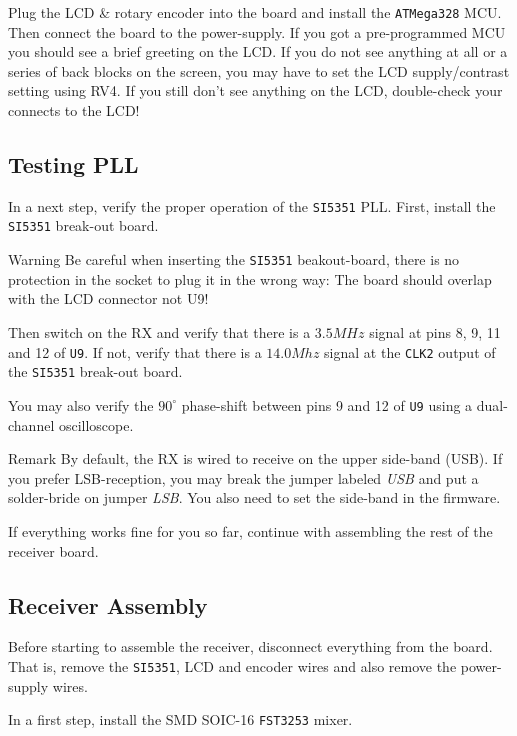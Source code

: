 \documentclass[10pt, a4paper,twoside]{scrartcl}
\newenvironment{remark}{\begin{bclogo}[couleur=blue!30,arrondi=.1,logo=\bcinfo,ombre=true]{Remark}}{\end{bclogo}}
\newenvironment{warning}{\begin{bclogo}[couleur=red!30,arrondi=.1,logo=\bcattention,ombre=true]{Warning}}{\end{bclogo}}
\begin{document}
 Plug the LCD \& rotary encoder into the board and install the \texttt{ATMega328} MCU. Then connect the board to the power-supply. If you got a pre-programmed MCU you should see a brief greeting on the LCD. If you do not see anything at all or a series of back blocks on the screen, you may have to set the LCD supply/contrast setting using RV4. If you still don't see anything on the LCD, double-check your connects to the LCD! 

\subsection{Testing PLL}
In a next step, verify the proper operation of the \texttt{SI5351} PLL. First, install the \texttt{SI5351} break-out board. 

\begin{warning}
 Be careful when inserting the \texttt{SI5351} beakout-board, there is no protection in the socket to plug it in the wrong way: The board should overlap with the LCD connector not U9!
\end{warning}
 
Then switch on the RX and verify that there is a $3.5MHz$ signal at pins 8, 9, 11 and 12 of \texttt{U9}. If not, verify that there is a $14.0Mhz$ signal at the \texttt{CLK2} output of the \texttt{SI5351} break-out board. 

You may also verify the $90^\circ$ phase-shift between pins 9 and 12 of \texttt{U9} using a dual-channel oscilloscope.

\begin{remark}
By default, the RX is wired to receive on the upper side-band (USB). If you prefer LSB-reception, you may break the jumper labeled \emph{USB} and put a solder-bride on jumper \emph{LSB}. You also need to set the side-band in the firmware.
\end{remark} 

If everything works fine for you so far, continue with assembling the rest of the receiver board.


\subsection{Receiver Assembly}
Before starting to assemble the receiver, disconnect everything from the board. That is, remove the \texttt{SI5351}, LCD and encoder wires and also remove the power-supply wires.

In a first step, install the SMD SOIC-16 \texttt{FST3253} mixer. 
\end{document}
